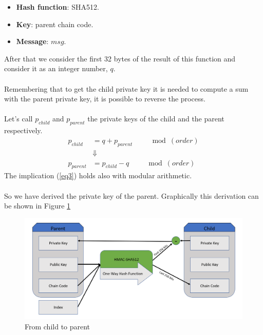 \begin{itemize}[label=$\odot$]
	\item \textbf{Hash function}: SHA512.
	\item \textbf{Key}: parent chain code.
	\item \textbf{Message}: $msg$.
\end{itemize}
After that we consider the first 32 bytes of the result of this function and consider it as an integer number, $q$.
\\ \\
Remembering that to get the child private key it is needed to compute a sum with the parent private key, it is possible to reverse the process. \\ \\
Let's call $p_{child}$ and $p_{parent}$ the private keys of the child and the parent respectively.
\begin{equation}\label{eq3}
\begin{split}
p_{child} &= q+p_{parent} \qquad \mod (order) \\
&\Downarrow \\
p_{parent} &=p_{child}-q \qquad \mod (order)
\end{split}
\end{equation}
The implication (\ref{eq3}) holds also with modular arithmetic.
\\ \\
So we have derived the private key of the parent. Graphically this derivation can be shown in Figure \ref{fig:from_child_to_parent}
\begin{figure}[ht!]
	\centering
	\includegraphics[width=14.5cm]{Figures/childtoparent.png} %
	\caption{From child to parent}
	\label{fig:from_child_to_parent}
\end{figure}



